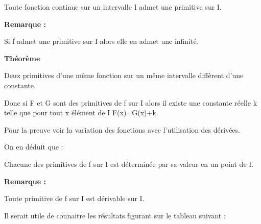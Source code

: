 \documentclass[12pt]{article}
\begin{document}
Toute fonction continue sur un intervalle I admet une primitive sur I.

\textbf{Remarque : }

Si f admet une primitive sur I alors elle en admet une infinité.

\textbf{Théorème }

Deux primitives d'une même fonction sur un même intervalle diffèrent d'une constante.
 
Donc si F et G sont des primitives de f sur I alors il existe une constante réelle k telle que pour tout x élément de I F(x)=G(x)+k
 
Pour la preuve voir la variation des fonctions avec l'utilisation des dérivées.
 
On en déduit que : 
 
Chacune des primitives de f sur I est déterminée par sa valeur en un point de I.

\textbf{Remarque :  }

Toute primitive de f sur I est dérivable sur I.
 
Il serait utile de connaitre les résultats figurant sur le tableau suivant : 
\end{document}
